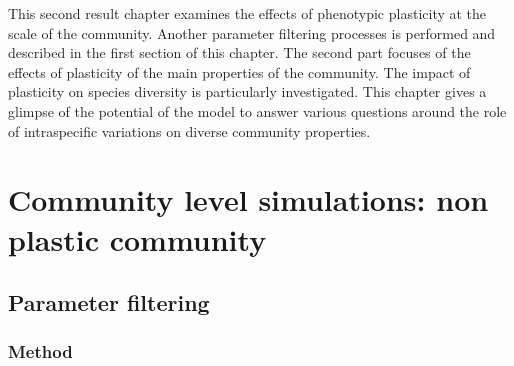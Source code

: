 
%
%

\begin{fullwidth}
This second result chapter examines the effects of phenotypic plasticity at the scale of the community. Another parameter filtering processes is performed and described in the first section of this chapter. The second part focuses of the effects of plasticity of the main properties of the community. The impact of plasticity on species diversity is particularly investigated. This chapter gives a glimpse of the potential of the model to answer various questions around the role of intraspecific variations on diverse community properties.
\end{fullwidth}

\chapter{Community level simulations: non plastic community}


\section{Parameter filtering}
\subsection{Method}

